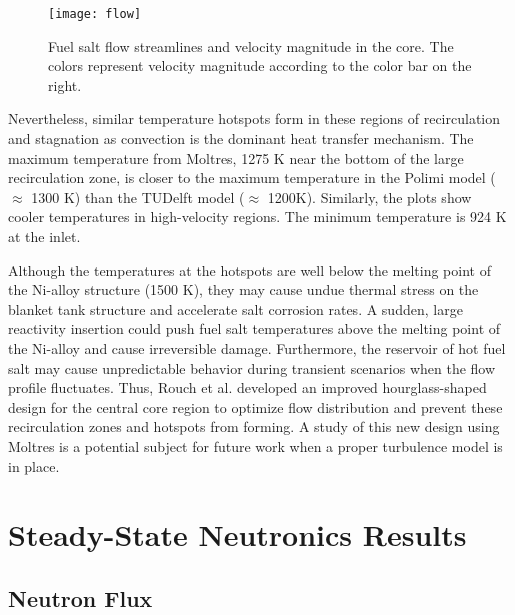\begin{figure}[htbp!]
    \centering
    \texttt{[image: flow]}
    \caption{Fuel salt flow streamlines and velocity magnitude in the core.
    The colors represent velocity magnitude according to the color bar on the
    right.}
    \label{fig:flow}
\end{figure}

Nevertheless, similar temperature hotspots form in these regions of
recirculation and stagnation as convection is the dominant heat transfer
mechanism. The maximum temperature from Moltres, 1275 K near the bottom of the
large recirculation zone, is closer to the maximum temperature in the Polimi
model ($\approx$ 1300 K) than the TUDelft model ($\approx$ 1200K). Similarly,
the plots show cooler temperatures in high-velocity regions. The minimum
temperature is 924 K at the inlet. 

Although the temperatures at the hotspots are well below the melting point of the Ni-alloy structure (1500 K), they may cause undue thermal stress on the
blanket tank structure and accelerate salt corrosion rates. A
sudden, large reactivity insertion could push fuel salt temperatures above the
melting point of the Ni-alloy and cause irreversible damage. Furthermore,
the reservoir of hot fuel salt may cause unpredictable behavior during
transient scenarios when the flow profile fluctuates.
Thus, Rouch et al. \cite{rouch_preliminary_2014} developed an improved
hourglass-shaped design for the central core region to optimize flow
distribution and prevent these
recirculation zones and hotspots from forming. A study of this new design
using Moltres is a potential subject for future work when a proper turbulence
model is in place.

\section{Steady-State Neutronics Results}

\subsection{Neutron Flux}


